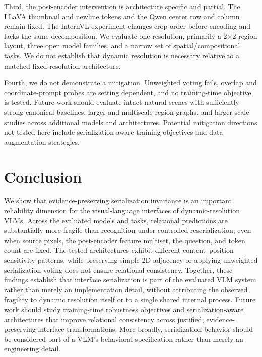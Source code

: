\documentclass[10pt,twocolumn,letterpaper]{article}
\begin{document}
Third, the post-encoder intervention is architecture specific and partial.
The LLaVA thumbnail and newline tokens and the Qwen center row and column remain fixed.
The InternVL experiment changes crop order before encoding and lacks the same decomposition.
We evaluate one resolution, primarily a 2$\times$2 region layout, three open model families, and a narrow set of spatial/compositional tasks.
We do not establish that dynamic resolution is necessary relative to a matched fixed-resolution architecture.

Fourth, we do not demonstrate a mitigation.
Unweighted voting fails, overlap and coordinate-prompt probes are setting dependent, and no training-time objective is tested.
Future work should evaluate intact natural scenes with sufficiently strong canonical baselines, larger and multiscale region graphs, and larger-scale studies across additional models and architectures.
Potential mitigation directions not tested here include serialization-aware training objectives and data augmentation strategies.

\section{Conclusion}

We show that evidence-preserving serialization invariance is an important reliability dimension for the visual-language interfaces of dynamic-resolution VLMs.
Across the evaluated models and tasks, relational predictions are substantially more fragile than recognition under controlled reserialization, even when source pixels, the post-encoder feature multiset, the question, and token count are fixed.
The tested architectures exhibit different content--position sensitivity patterns, while preserving simple 2D adjacency or applying unweighted serialization voting does not ensure relational consistency.
Together, these findings establish that interface serialization is part of the evaluated VLM system rather than merely an implementation detail, without attributing the observed fragility to dynamic resolution itself or to a single shared internal process.
Future work should study training-time robustness objectives and serialization-aware architectures that improve relational consistency across justified, evidence-preserving interface transformations.
More broadly, serialization behavior should be considered part of a VLM's behavioral specification rather than merely an engineering detail.

{\small
{}

}
\end{document}

